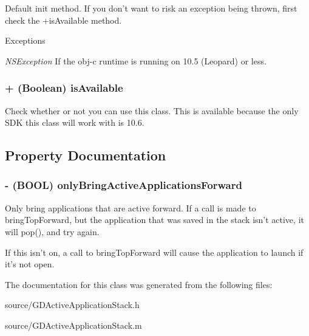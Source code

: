Default init method. If you don't want to risk an exception being thrown, first check the +isAvailable method.


\begin{DoxyExceptions}{Exceptions}
\item[{\em NSException}]If the obj-\/c runtime is running on 10.5 (Leopard) or less. \end{DoxyExceptions}
\hypertarget{interface_g_d_active_application_stack_a10055d2ffec472e9413a8d84a7d8dd67}{
\subsubsection[{isAvailable}]{\setlength{\rightskip}{0pt plus 5cm}+ (Boolean) isAvailable }}
\label{interface_g_d_active_application_stack_a10055d2ffec472e9413a8d84a7d8dd67}


Check whether or not you can use this class. This is available because the only SDK this class will work with is 10.6. 

\subsection{Property Documentation}
\hypertarget{interface_g_d_active_application_stack_a5714844d3e17a156cca14b1f383b3dbe}{
\subsubsection[{onlyBringActiveApplicationsForward}]{\setlength{\rightskip}{0pt plus 5cm}-\/ (BOOL) onlyBringActiveApplicationsForward}}
\label{interface_g_d_active_application_stack_a5714844d3e17a156cca14b1f383b3dbe}


Only bring applications that are active forward. If a call is made to bringTopForward, but the application that was saved in the stack isn't active, it will pop(), and try again.

If this isn't on, a call to bringTopForward will cause the application to launch if it's not open. 

The documentation for this class was generated from the following files:\begin{DoxyCompactItemize}
\item 
source/GDActiveApplicationStack.h\item 
source/GDActiveApplicationStack.m\end{DoxyCompactItemize}
